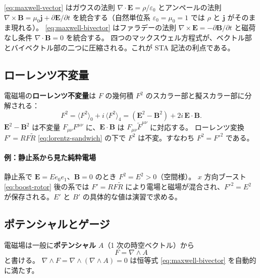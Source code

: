\documentclass[dvipdfmx,a4paper,oneside]{jsbook}
\numberwithin{equation}{chapter}
\begin{document}
\eqref{eq:maxwell-vector} はガウスの法則 \(\nabla\cdot\mathbf{E} = \rho/\varepsilon_0\) とアンペールの法則 \(\nabla\times\mathbf{B} = \mu_0\mathbf{j} + \partial\mathbf{E}/\partial t\) を統合する（自然単位系 \(\varepsilon_0=\mu_0=1\) では \(\rho\) と \(\mathbf{j}\) がそのまま現れる）。
\eqref{eq:maxwell-bivector} はファラデーの法則 \(\nabla\times\mathbf{E} = -\partial\mathbf{B}/\partial t\) と磁荷なし条件 \(\nabla\cdot\mathbf{B}=0\) を統合する。
四つのマックスウェル方程式が、ベクトル部とバイベクトル部の二つに圧縮される。これが STA 記法の利点である。

\subsection{ローレンツ不変量}

電磁場の\textbf{ローレンツ不変量}は \(F\) の幾何積 \(F^2\) のスカラー部と擬スカラー部に分解される：
\begin{equation}
  F^2 = \langle F^2 \rangle_0 + i\,\langle F^2 \rangle_4
  = (\mathbf{E}^2 - \mathbf{B}^2) + 2i\,\mathbf{E}\cdot\mathbf{B}.
  \label{eq:em-invariants}
\end{equation}
\(\mathbf{E}^2 - \mathbf{B}^2\) は不変量 \(F_{\mu\nu}F^{\mu\nu}\) に、\(\mathbf{E}\cdot\mathbf{B}\) は \(F_{\mu\nu}\tilde{F}^{\mu\nu}\) に対応する。
ローレンツ変換 \(F' = RF\widetilde{R}\) \eqref{eq:lorentz-sandwich} の下で \(F^2\) は不変。すなわち \(F^2 = F'^2\) である。

\paragraph{例：静止系から見た純粋電場}
静止系で \(\mathbf{E} = E e_0 e_1\)、\(\mathbf{B}=0\) のとき \(F^2 = E^2 > 0\)（空間様）。
\(x\) 方向ブースト \eqref{eq:boost-rotor} 後の系では \(F' = RF\widetilde{R}\) により電場と磁場が混合され、\(F'^2 = E^2\) が保存される。\(E'\) と \(B'\) の具体的な値は演習で求める。

\subsection{ポテンシャルとゲージ}

電磁場は一般に\textbf{ポテンシャル} \(A\)（1 次の時空ベクトル）から
\begin{equation}
  F = \nabla\wedge A
  \label{eq:em-potential}
\end{equation}
と書ける。
\(\nabla\wedge F = \nabla\wedge(\nabla\wedge A) = 0\) は恒等式 \eqref{eq:maxwell-bivector} を自動的に満たす。
\end{document}
